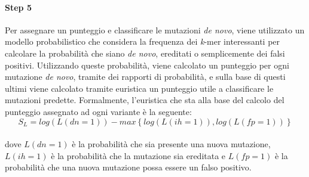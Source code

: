\documentclass[../main.tex]{subfiles}
\begin{document}
\paragraph{Step 5} 

Per assegnare un punteggio e classificare le mutazioni \textit{de novo}, viene utilizzato un modello probabilistico che considera la frequenza dei \textit{k}-mer interessanti per calcolare la probabilità che siano \textit{de novo}, ereditati o semplicemente dei falsi positivi. Utilizzando queste probabilità, viene calcolato un punteggio per ogni mutazione \textit{de novo}, tramite dei rapporti di probabilità, e sulla base di questi ultimi viene calcolato tramite euristica un punteggio utile a classificare le mutazioni predette. Formalmente, l'euristica che sta alla base del calcolo del punteggio assegnato ad ogni variante è la seguente: \\
$$S_L = log \left(L\left(dn=1\right)\right) - max\left\lbrace log\left(L\left(ih=1\right)\right), log\left(L\left(fp=1\right)\right)\right\rbrace$$
\noindent
\\
dove $L\left(dn=1\right)$ è la probabilità che sia presente una nuova mutazione, $L\left(ih=1\right)$ è la probabilità che la mutazione sia ereditata e $L\left(fp=1\right)$ è la probabilità che una nuova mutazione possa essere un falso positivo.

%
%
\end{document}
